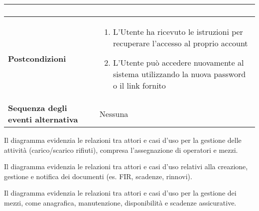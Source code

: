 \documentclass[a4paper]{report}
\begin{document}
\begin{table}[t!]
\begin{tabular}{|p{3.9cm}|p{9.9cm}|}
\begin{enumerate}[leftmargin=14pt,label=\arabic*.,labelsep=0.5em,topsep=0pt,partopsep=0pt,parsep=0pt,itemsep=0pt]
\end{enumerate}\\ \hline
\textbf{Postcondizioni} & \begin{enumerate}[leftmargin=14pt,label=\arabic*.,labelsep=0.5em,topsep=0pt,partopsep=0pt,parsep=0pt,itemsep=0pt]
    \item L’Utente ha ricevuto le istruzioni per recuperare l’accesso al proprio account
    \item L’Utente può accedere nuovamente al sistema utilizzando la nuova password o il link fornito
    \end{enumerate} \\ \hline
\textbf{Sequenza degli eventi alternativa} & Nessuna \\ \hline
\end{tabular}
\end{table}

\clearpage
{}

Il diagramma evidenzia le relazioni tra attori e casi d’uso per la gestione delle attività (carico/scarico rifiuti), compresa l'assegnazione di operatori e mezzi.

\clearpage
{}

Il diagramma evidenzia le relazioni tra attori e casi d’uso relativi alla creazione, gestione e notifica dei documenti (es. FIR, scadenze, rinnovi).

\clearpage
{}

Il diagramma evidenzia le relazioni tra attori e casi d’uso per la gestione dei mezzi, come anagrafica, manutenzione, disponibilità e scadenze assicurative.

\clearpage
{}


\end{document}
